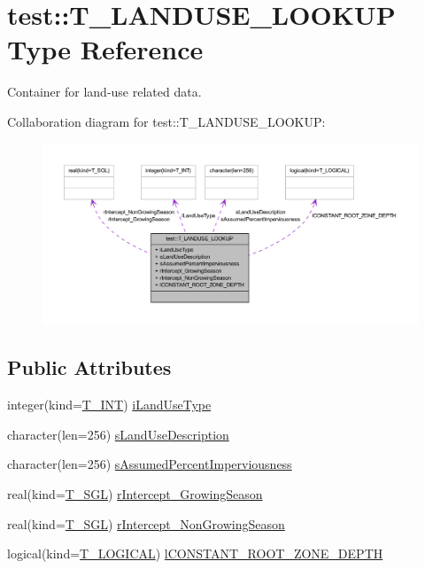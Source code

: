 \hypertarget{typetest_1_1_t___l_a_n_d_u_s_e___l_o_o_k_u_p}{
\section{test::T\_\-LANDUSE\_\-LOOKUP Type Reference}
\label{typetest_1_1_t___l_a_n_d_u_s_e___l_o_o_k_u_p}
}


Container for land-\/use related data.  




Collaboration diagram for test::T\_\-LANDUSE\_\-LOOKUP:\nopagebreak
\begin{figure}[H]
\begin{center}
\leavevmode
\includegraphics[width=400pt]{typetest_1_1_t___l_a_n_d_u_s_e___l_o_o_k_u_p__coll__graph}
\end{center}
\end{figure}
\subsection*{Public Attributes}
\begin{DoxyCompactItemize}
\item 
integer(kind=\hyperlink{namespacetest_a6f91ebd89b58cfcc5da99faed9385c1e}{T\_\-INT}) \hyperlink{typetest_1_1_t___l_a_n_d_u_s_e___l_o_o_k_u_p_a993f4c54aa858ef686236d68c85a640e}{iLandUseType}
\item 
character(len=256) \hyperlink{typetest_1_1_t___l_a_n_d_u_s_e___l_o_o_k_u_p_a1894ba6b22e884df7ca4023902e5bad5}{sLandUseDescription}
\item 
character(len=256) \hyperlink{typetest_1_1_t___l_a_n_d_u_s_e___l_o_o_k_u_p_a6c2aa3ab3e9f5f53471866888164bc76}{sAssumedPercentImperviousness}
\item 
real(kind=\hyperlink{namespacetest_a04d8b9090502de3a00046fe904bc3d99}{T\_\-SGL}) \hyperlink{typetest_1_1_t___l_a_n_d_u_s_e___l_o_o_k_u_p_aa4321c2765690512bcc0cd6359a4f928}{rIntercept\_\-GrowingSeason}
\item 
real(kind=\hyperlink{namespacetest_a04d8b9090502de3a00046fe904bc3d99}{T\_\-SGL}) \hyperlink{typetest_1_1_t___l_a_n_d_u_s_e___l_o_o_k_u_p_a5a0a4a4068f5162d44b526fcb89f9724}{rIntercept\_\-NonGrowingSeason}
\item 
logical(kind=\hyperlink{namespacetest_acdeac586276a7d1d394fb5eddc77fc3d}{T\_\-LOGICAL}) \hyperlink{typetest_1_1_t___l_a_n_d_u_s_e___l_o_o_k_u_p_a7f54a9f4c95447a8362aa330edaeeee6}{lCONSTANT\_\-ROOT\_\-ZONE\_\-DEPTH}
\end{DoxyCompactItemize}


